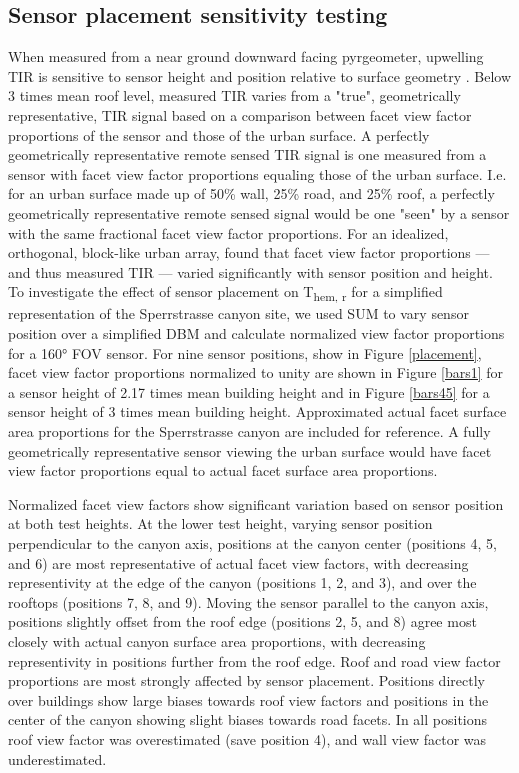 \begin{bibunit}
\section{Sensor placement sensitivity testing} \label{Methodological limitations and considerations}

 When measured from a near ground downward facing pyrgeometer, upwelling TIR is sensitive to sensor height and position relative to surface geometry \citep{Adderley2015, Roberts2010}. Below 3 times mean roof level, measured TIR varies from a "true", geometrically representative, TIR signal based on a comparison between facet view factor proportions of the sensor and those of the urban surface. A perfectly geometrically representative remote sensed TIR signal is one measured from a sensor with facet view factor proportions equaling those of the urban surface. I.e. for an urban surface made up of 50\% wall, 25\% road, and 25\% roof, a perfectly geometrically representative remote sensed signal would be one "seen" by a sensor with the same fractional facet view factor proportions. For an idealized, orthogonal, block-like urban array, \citet{Roberts2010} found that facet view factor proportions --- and thus measured TIR --- varied significantly with sensor position and height. To investigate the effect of sensor placement on T\textsubscript{hem, r} for a simplified representation of the Sperrstrasse canyon site, we used SUM to vary sensor position over a simplified DBM and calculate normalized view factor proportions for a 160\si{\degree} FOV sensor. For nine sensor positions, show in Figure \ref{placement}, facet view factor proportions normalized to unity are shown in Figure \ref{bars1} for a sensor height of 2.17 times mean building height and in Figure \ref{bars45} for a sensor height of 3 times mean building height. Approximated actual facet surface area proportions for the Sperrstrasse canyon are included for reference. A fully geometrically representative sensor viewing the urban surface would have facet view factor proportions equal to actual facet surface area proportions. 
  
 Normalized facet view factors show significant variation based on sensor position at both test heights. At the lower test height, varying sensor position perpendicular to the canyon axis, positions at the canyon center (positions 4, 5, and 6) are most representative of actual facet view factors, with decreasing representivity at the edge of the canyon (positions 1, 2, and 3), and over the rooftops (positions 7, 8, and 9). Moving the sensor parallel to the canyon axis, positions slightly offset from the roof edge (positions 2, 5, and 8) agree most closely with actual canyon surface area proportions, with decreasing representivity in positions further from the roof edge. Roof and road view factor proportions are most strongly affected by sensor placement. Positions directly over buildings show large biases towards roof view factors and positions in the center of the canyon showing slight biases towards road facets. In all positions roof view factor was overestimated (save position 4), and wall view factor was underestimated.
 

\end{bibunit}
